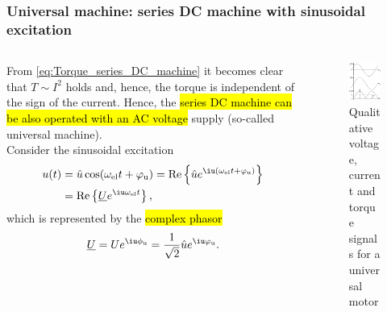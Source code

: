 \begin{frame}
	\frametitle{Universal machine: series DC machine with sinusoidal excitation}
	\begin{columns}
		\begin{column}{0.55\textwidth}
		From \eqref{eq:Torque_series_DC_machine} it becomes clear that $T\sim I^2$ holds and, hence, the torque is independent of the sign of the current. Hence, the \hl{series DC machine can be also operated with an AC voltage} supply (so-called universal machine).
		\\[1em] \pause 
		Consider the sinusoidal excitation 
		\begin{align*}
			u(t) &= \hat{u} \cos(\omega_\mathrm{el} t+ \varphi_{\mathrm{u}}) = \mathrm{Re}\left\{\hat{u} e^{\iu (\omega_\mathrm{el} t + \varphi_{\mathrm{u}})}\right\}\\ &= \mathrm{Re}\left\{\underline{U} e^{\iu \omega_\mathrm{el} t}\right\},	
		\end{align*} \pause
		which is represented by the \hl{complex phasor} 
		\begin{equation}
			\underline{U} = U e ^{\iu \phi_{\mathrm{u}}} = \frac{1}{\sqrt{2}}\hat{u} e ^{\iu \varphi_{\mathrm{u}}}. 
		\end{equation}
\end{column}
\hfill \pause
\begin{column}{0.45\textwidth}
	\begin{figure}
		\centering
		\includegraphics[scale=1.05]{fig/lec03/Universal_machine_time_signals.pdf}
		\caption{Qualitative voltage, current and torque signals for a universal motor}
	\end{figure}
\end{column}
\end{columns}
\end{frame}

